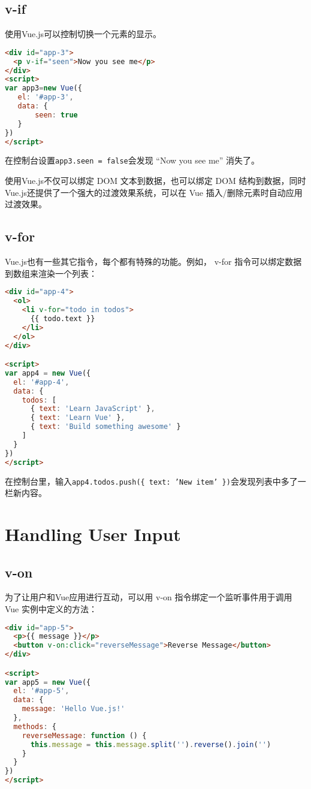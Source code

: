 \subsection{v-if}



使用Vue.js可以控制切换一个元素的显示。


\begin{lstlisting}[language=HTML]
<div id="app-3">
  <p v-if="seen">Now you see me</p>
</div>
<script>
var app3=new Vue({
   el: '#app-3',
   data: {
       seen: true
   }
})
</script>
\end{lstlisting}

在控制台设置\texttt{app3.seen = false}会发现 “Now you see me” 消失了。


使用Vue.js不仅可以绑定 DOM 文本到数据，也可以绑定 DOM 结构到数据，同时Vue.js还提供了一个强大的过渡效果系统，可以在 Vue 插入/删除元素时自动应用过渡效果。

\subsection{v-for}

Vue.js也有一些其它指令，每个都有特殊的功能。例如， v-for 指令可以绑定数据到数组来渲染一个列表：

\begin{lstlisting}[language=HTML]
<div id="app-4">
  <ol>
    <li v-for="todo in todos">
      {{ todo.text }}
    </li>
  </ol>
</div>

<script>
var app4 = new Vue({
  el: '#app-4',
  data: {
    todos: [
      { text: 'Learn JavaScript' },
      { text: 'Learn Vue' },
      { text: 'Build something awesome' }
    ]
  }
})
</script>
\end{lstlisting}

在控制台里，输入\texttt{app4.todos.push(\{ text: 'New item' \})}会发现列表中多了一栏新内容。

\section{Handling User Input}


\subsection{v-on}


为了让用户和Vue应用进行互动，可以用 v-on 指令绑定一个监听事件用于调用 Vue 实例中定义的方法：

\begin{lstlisting}[language=HTML]
<div id="app-5">
  <p>{{ message }}</p>
  <button v-on:click="reverseMessage">Reverse Message</button>
</div>

<script>
var app5 = new Vue({
  el: '#app-5',
  data: {
    message: 'Hello Vue.js!'
  },
  methods: {
    reverseMessage: function () {
      this.message = this.message.split('').reverse().join('')
    }
  }
})
</script>
\end{lstlisting}

